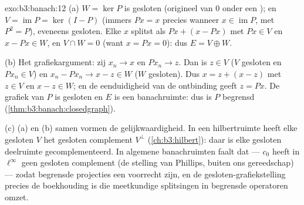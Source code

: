 \begin{solution}{exo:b3:banach:12}
(a) $W = \ker P$ is gesloten (origineel van $0$ onder een ); en $V = \operatorname{im}P = \ker(I - P)$ (immers
$Px = x$ precies wanneer $x \in \operatorname{im}P$, met $P^2 =
P$), eveneens gesloten. Elke $x$ splitst als $Px + (x - Px)$ met
$Px \in V$ en $x - Px \in W$, en $V \cap W = 0$ (want $x = Px =
0$): dus $E = V \oplus W$.

(b) Het grafiekargument: zij $x_n \to x$ en $Px_n \to z$. Dan is
$z \in V$ ($V$ gesloten en $Px_n \in V$) en $x_n - Px_n \to x - z
\in W$ ($W$ gesloten). Dus $x = z + (x - z)$ met $z \in V$ en $x -
z \in W$; en de eenduidigheid van de ontbinding geeft $z = Px$. De
grafiek van $P$ is gesloten en $E$ is een banachruimte: dus is $P$
begrensd (\cref{thm:b3:banach:closedgraph}).

(c) (a) en (b) samen vormen de gelijkwaardigheid. In een
hilbertruimte heeft elke gesloten $V$ het gesloten complement
$V^\perp$ (\cref{ch:b3:hilbert}): daar is elke gesloten deelruimte
gecomplementeerd. In algemene banachruimten faalt dat --- $c_0$
heeft in $\ell^\infty$ geen gesloten complement (de stelling van
Phillips, buiten ons gereedschap) --- zodat begrensde projecties
een voorrecht zijn, en de gesloten-grafiekstelling precies de
boekhouding is die meetkundige splitsingen in begrensde
operatoren omzet.
\end{solution}

